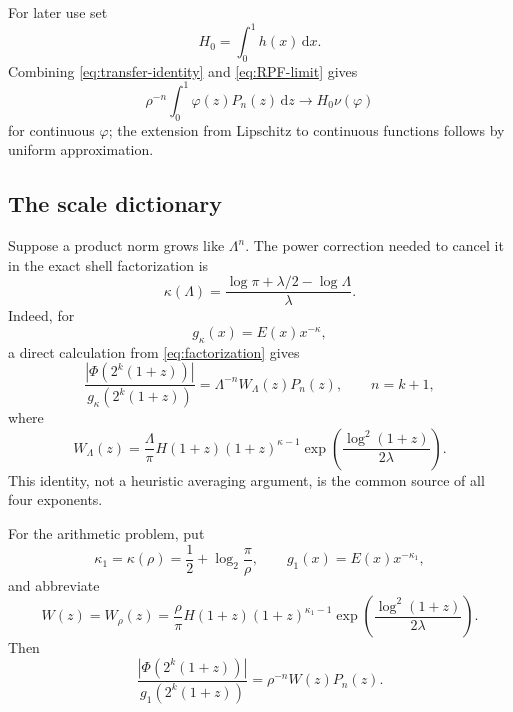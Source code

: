 \documentclass[11pt,oneside]{article}
\theoremstyle{definition}
\theoremstyle{remark}
\newcommand{\dd}{\,\mathrm d}
\begin{document}
For later use set
\begin{equation}
 H_0=\int_0^1h(x)\dd x.
 \label{eq:H0}
\end{equation}
Combining \eqref{eq:transfer-identity} and \eqref{eq:RPF-limit} gives
\begin{equation}
 \rho^{-n}\int_0^1\varphi(z)P_n(z)\dd z
 \longrightarrow H_0\nu(\varphi)
 \label{eq:weighted-P-limit}
\end{equation}
for continuous \(\varphi\); the extension from Lipschitz to continuous
functions follows by uniform approximation.

\subsection{The scale dictionary}

Suppose a product norm grows like \(\Lambda^n\).  The power correction needed
to cancel it in the exact shell factorization is
\begin{equation}
 \boxed{
 \kappa(\Lambda)=
 \frac{\log\pi+\lambda/2-\log\Lambda}{\lambda}.}
 \label{eq:kappa-dictionary}
\end{equation}
Indeed, for
\[
 g_\kappa(x)=E(x)x^{-\kappa},
\]
a direct calculation from \eqref{eq:factorization} gives
\begin{equation}
 \frac{|\Phi(2^k(1+z))|}{g_\kappa(2^k(1+z))}
 =\Lambda^{-n}W_\Lambda(z)P_n(z),
 \qquad n=k+1,
 \label{eq:normalized-shell-general}
\end{equation}
where
\begin{equation}
 W_\Lambda(z)=\frac{\Lambda}{\pi}H(1+z)(1+z)^{\kappa-1}
 \exp\!\left(\frac{\log^2(1+z)}{2\lambda}\right).
 \label{eq:Wlambda}
\end{equation}
This identity, not a heuristic averaging argument, is the common source of all
four exponents.

For the arithmetic problem, put
\begin{equation}
 \kappa_1=\kappa(\rho)
 =\frac12+\log_2\frac\pi\rho,
 \qquad
 g_1(x)=E(x)x^{-\kappa_1},
 \label{eq:g1}
\end{equation}
and abbreviate
\begin{equation}
 W(z)=W_\rho(z)
 =\frac\rho\pi H(1+z)(1+z)^{\kappa_1-1}
 \exp\!\left(\frac{\log^2(1+z)}{2\lambda}\right).
 \label{eq:W}
\end{equation}
Then
\begin{equation}
 \boxed{
 \frac{|\Phi(2^k(1+z))|}{g_1(2^k(1+z))}
 =\rho^{-n}W(z)P_n(z).}
 \label{eq:normalized-shell}
\end{equation}
\end{document}
